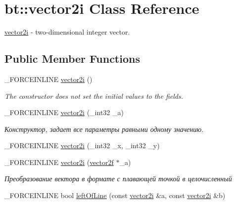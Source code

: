 \hypertarget{classbt_1_1vector2i}{\section{bt\-:\-:vector2i Class Reference}
\label{classbt_1_1vector2i}
}


\hyperlink{classbt_1_1vector2i}{vector2i} -\/ two-\/dimensional integer vector.  


\subsection*{Public Member Functions}
\begin{DoxyCompactItemize}
\item 
\hypertarget{classbt_1_1vector2i_a93d17352b71679d2c65c59040e9cee4a}{\-\_\-\-F\-O\-R\-C\-E\-I\-N\-L\-I\-N\-E \hyperlink{classbt_1_1vector2i_a93d17352b71679d2c65c59040e9cee4a}{vector2i} ()}\label{classbt_1_1vector2i_a93d17352b71679d2c65c59040e9cee4a}

\begin{DoxyCompactList}\small\item\em The constructor does not set the initial values to the fields. \end{DoxyCompactList}\item 
\hypertarget{classbt_1_1vector2i_ad8c5017f60ae9ced470d05cd526e1b71}{\-\_\-\-F\-O\-R\-C\-E\-I\-N\-L\-I\-N\-E \hyperlink{classbt_1_1vector2i_ad8c5017f60ae9ced470d05cd526e1b71}{vector2i} (\-\_\-int32 \-\_\-a)}\label{classbt_1_1vector2i_ad8c5017f60ae9ced470d05cd526e1b71}

\begin{DoxyCompactList}\small\item\em Конструктор, задает все параметры равными одному значению. \end{DoxyCompactList}\item 
\-\_\-\-F\-O\-R\-C\-E\-I\-N\-L\-I\-N\-E \hyperlink{classbt_1_1vector2i_a602c39ca70778b1ecfe0fcfeb31719d1}{vector2i} (\-\_\-int32 \-\_\-x, \-\_\-int32 \-\_\-y)
\item 
\hypertarget{classbt_1_1vector2i_aae13c2245dac167e009c576a3223082b}{\-\_\-\-F\-O\-R\-C\-E\-I\-N\-L\-I\-N\-E \hyperlink{classbt_1_1vector2i_aae13c2245dac167e009c576a3223082b}{vector2i} (\hyperlink{classbt_1_1vector2f}{vector2f} $\ast$\-\_\-a)}\label{classbt_1_1vector2i_aae13c2245dac167e009c576a3223082b}

\begin{DoxyCompactList}\small\item\em Преобразование вектора в формате с плавающей точкой в целочисленный \end{DoxyCompactList}\item 
\hypertarget{classbt_1_1vector2i_a717d3739548288351a92a139f0324bfa}{\-\_\-\-F\-O\-R\-C\-E\-I\-N\-L\-I\-N\-E bool \hyperlink{classbt_1_1vector2i_a717d3739548288351a92a139f0324bfa}{left\-Of\-Line} (const \hyperlink{classbt_1_1vector2i}{vector2i} \&a, const \hyperlink{classbt_1_1vector2i}{vector2i} \&b)}\label{classbt_1_1vector2i_a717d3739548288351a92a139f0324bfa}


\end{DoxyCompactItemize}
